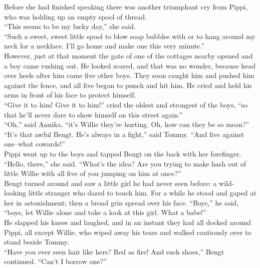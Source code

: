 \documentclass{standard}
\begin{document}
Before she had finished speaking there was another triumphant cry from Pippi, who was holding up an empty spool of thread.\\

``This seems to be my lucky day,” she said.\\

``Such a sweet, sweet little spool to blow soap bubbles with or to hang around my neck for a necklace. I’ll go home and make one this very minute.”\\

However, just at that moment the gate of one of the cottages nearby opened and a boy came rushing out. He looked scared, and that was no wonder, because head over heels after him came five other boys. They soon caught him and pushed him against the fence, and all five began to punch and hit him. He cried and held his arms in front of his face to protect himself.\\

``Give it to him! Give it to him!” cried the oldest and strongest of the boys, ``so that he’ll never dare to show himself on this street again.”\\

``Oh,” said Annika, ``it’s Willie they’re hurting. Oh, how can they be so mean?”\\

``It’s that awful Bengt. He’s always in a fight,” said Tommy. ``And five against one--what cowards!”\\

Pippi went up to the boys and tapped Bengt on the back with her forefinger. ``Hello, there,” she said. ``What’s the idea? Are you trying to make hash out of little Willie with all five of you jumping on him at once?”\\

Bengt turned around and saw a little girl he had never seen before: a wild- looking little stranger who dared to touch him. For a while he stood and gaped at her in astonishment; then a broad grin spread over his face. ``Boys,” he said, ``boys, let Willie alone and take a look at this girl. What a babe!”\\

He slapped his knees and laughed, and in an instant they had all docked around Pippi, all except Willie, who wiped away his tears and walked cautiously over to stand beside Tommy.\\

``Have you ever seen hair like hers? Red as fire! And such shoes,” Bengt continued. ``Can’t I borrow one?”\\
\end{document}
